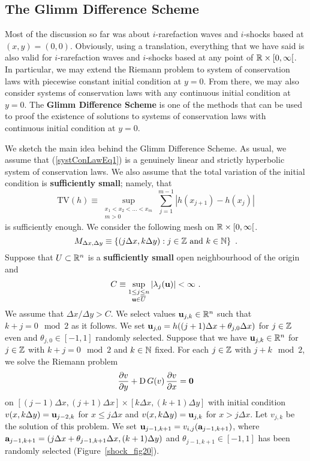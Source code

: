 \subsection{The Glimm Difference Scheme}

Most of the discussion so far was about $i$-rarefaction waves and
$i$-shocks based at $(x,y) = (0,0)$.  Obviously, using a translation,
everything that we have said is also valid for $i$-rarefaction waves
and $i$-shocks based at any point of $\mathbb{R}\times [0,\infty[$.
In particular, we may extend the Riemann problem to system of
conservation laws with piecewise constant initial condition at $y=0$.
From there, we may also consider systems of conservation laws with any
continuous initial condition at $y=0$.  The
{\bfseries Glimm Difference Scheme} is one of the methods that can be used to
proof the existence of solutions to systems of conservation laws with
continuous initial condition at $y=0$.

We sketch the main idea behind the Glimm Difference Scheme.  As usual,
we assume that (\ref{systConLawEq1}) is a genuinely linear and
strictly hyperbolic system of conservation laws.  We also assume that
the total variation of the initial condition is {\bfseries sufficiently small};
namely, that
\[
  \text{TV}(h) \equiv
\sup_{\substack{x_1 < x_2 < \ldots < x_m\\ m >0}} \sum_{j=1}^{m-1} \left|
h(x_{j+1}) - h(x_j) \right|
\]
is sufficiently enough.  We consider the following mesh on
$\mathbb{R}\times [0,\infty[$.
\[
  M_{\Delta x, \Delta y} \equiv \left\{ (j \Delta x , k \Delta y) :
    j \in \mathbb{Z} \ \text{and} \ k \in \mathbb{N} \right\} \ .
\]
Suppose that $U \subset \mathbb{R}^n$ is a {\bfseries sufficiently small}
open neighbourhood of the origin and
\[
  C \equiv \sup_{\substack{1 \leq j \leq n\\
    \mathbf{u} \in \overline{U}}} \left| \lambda_j(\mathbf{u}) \right|
< \infty \ .
\]
We assume that $\Delta x / \Delta y > C$.  We select values
$\mathbf{u}_{j,k} \in \mathbb{R}^n$ such that $k+j = 0 \mod{2}$ as it follows.
We set $\mathbf{u}_{j,0} = h((j+1)\Delta x + \theta_{j,0} \Delta x)$ for
$j \in \mathbb{Z}$ even and $\theta_{j,0} \in [-1,1]$ randomly selected.  Suppose
that we have $\mathbf{u}_{j,k} \in \mathbb{R}^n$
for $j\in \mathbb{Z}$ with $k+j =0 \mod{2}$ and $k\in \mathbb{N}$ fixed.  For each
$j \in \mathbb{Z}$ with $j+k \mod{2}$, we solve the Riemann problem
\[
  \frac{\partial{v}}{\partial y} + \operatorname{D} G(v) \, \frac{\partial{v}}{\partial x} = \mathbf{0}
\]
on $[(j-1)\Delta x, (j+1)\Delta x]\times [k\Delta x,(k+1)\Delta y]$
with initial condition
$v(x, k\Delta y) = \mathbf{u}_{j-2,k}$ for $ x \leq j \Delta x$
and $v(x, k\Delta y) = \mathbf{u}_{j,k}$ for $ x > j \Delta x$.
Let $v_{j,k}$ be the solution of this problem.  We set
$\mathbf{u}_{j-1,k+1} = v_{i,j}(\mathbf{a}_{j-1,k+1})$, where
$\mathbf{a}_{j-1,k+1} = (j\Delta x + \theta_{j-1,k+1} \Delta x, (k+1) \Delta y)$
and $\theta_{j-1,k+1} \in [-1,1]$ has been randomly selected
(Figure~\ref{shock_fig20}).

